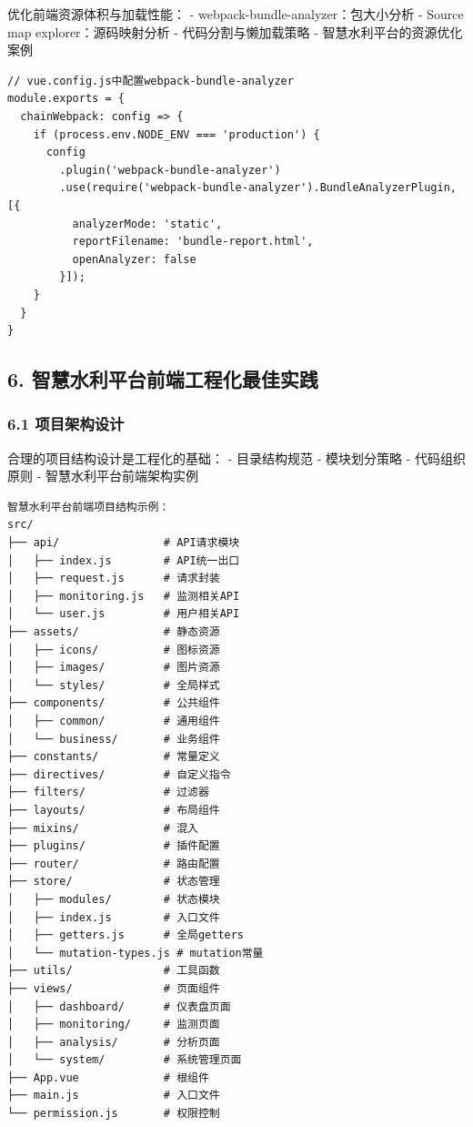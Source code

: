 优化前端资源体积与加载性能： - webpack-bundle-analyzer：包大小分析 -
Source map explorer：源码映射分析 - 代码分割与懒加载策略 -
智慧水利平台的资源优化案例

\begin{lstlisting}
// vue.config.js中配置webpack-bundle-analyzer
module.exports = {
  chainWebpack: config => {
    if (process.env.NODE_ENV === 'production') {
      config
        .plugin('webpack-bundle-analyzer')
        .use(require('webpack-bundle-analyzer').BundleAnalyzerPlugin, [{
          analyzerMode: 'static',
          reportFilename: 'bundle-report.html',
          openAnalyzer: false
        }]);
    }
  }
}
\end{lstlisting}

\subsection{6.
智慧水利平台前端工程化最佳实践}\label{ux667aux6167ux6c34ux5229ux5e73ux53f0ux524dux7aefux5de5ux7a0bux5316ux6700ux4f73ux5b9eux8df5}

\subsubsection{6.1
项目架构设计}\label{ux9879ux76eeux67b6ux6784ux8bbeux8ba1}

合理的项目结构设计是工程化的基础： - 目录结构规范 - 模块划分策略 -
代码组织原则 - 智慧水利平台前端架构实例

\begin{lstlisting}
智慧水利平台前端项目结构示例：
src/
├── api/                # API请求模块
│   ├── index.js        # API统一出口
│   ├── request.js      # 请求封装
│   ├── monitoring.js   # 监测相关API
│   └── user.js         # 用户相关API
├── assets/             # 静态资源
│   ├── icons/          # 图标资源
│   ├── images/         # 图片资源
│   └── styles/         # 全局样式
├── components/         # 公共组件
│   ├── common/         # 通用组件
│   └── business/       # 业务组件
├── constants/          # 常量定义
├── directives/         # 自定义指令
├── filters/            # 过滤器
├── layouts/            # 布局组件
├── mixins/             # 混入
├── plugins/            # 插件配置
├── router/             # 路由配置
├── store/              # 状态管理
│   ├── modules/        # 状态模块
│   ├── index.js        # 入口文件
│   ├── getters.js      # 全局getters
│   └── mutation-types.js # mutation常量
├── utils/              # 工具函数
├── views/              # 页面组件
│   ├── dashboard/      # 仪表盘页面
│   ├── monitoring/     # 监测页面
│   ├── analysis/       # 分析页面
│   └── system/         # 系统管理页面
├── App.vue             # 根组件
├── main.js             # 入口文件
└── permission.js       # 权限控制
\end{lstlisting}

